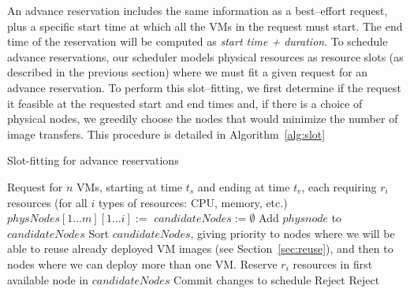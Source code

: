 An advance reservation includes the same information as a best--effort request, plus a specific start time at which all the VMs in the request must start. The end time of the reservation will be computed as \emph{start time + duration}. To schedule advance reservations, our scheduler models physical resources as resource slots (as described in the previous section) where we must fit a given request for an advance reservation. To perform this slot--fitting, we first determine if the request it feasible at the requested start and end times and, if there is a choice of physical nodes, we greedily choose the nodes that would minimize the number of image transfers. This procedure is detailed in Algorithm~\ref{alg:slot}

\begin{algorithm}
\caption{Slot-fitting for advance reservations}
\label{alg:slot}
\begin{algorithmic}
\REQUIRE Request for $n$ VMs, starting at time $t_s$ and ending at time $t_e$, each requiring $r_i$ resources (for all $i$ types of resources: CPU, memory, etc.)
\STATE
\STATE $physNodes[1\ldots m][1\ldots i]:=$ 
\STATE
\STATE $candidateNodes:=\emptyset$
\STATE Add $physnode$ to $candidateNodes$
\ENDIF 
\ENDFOR
\STATE
\STATE {}
\STATE
\STATE Sort $candidateNodes$, giving priority to nodes where we will be able to reuse already deployed VM images (see Section~\ref{sec:reuse}), and then to nodes where we can deploy more than one VM.
\STATE
{}
\STATE Reserve $r_i$ resources in first available node in $candidateNodes$
\ENDFOR
\STATE
{}
\STATE {}
\STATE Commit changes to schedule
\ELSE
\STATE Reject
\ENDIF
\ELSE
\STATE Reject
\ENDIF
\end{algorithmic}
\end{algorithm}



